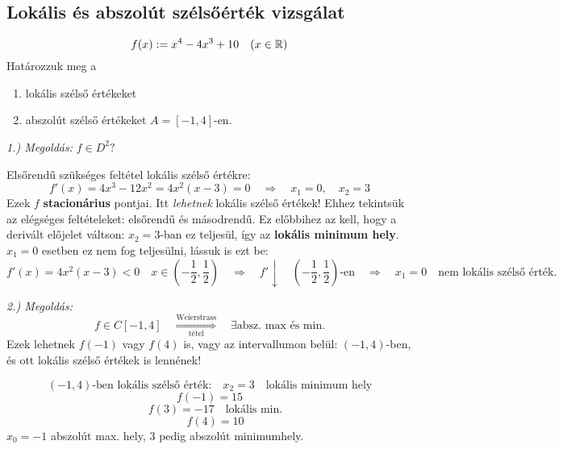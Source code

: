 \documentclass[a4paper,11.5pt]{article}
\begin{document}
	\subsection{Lokális és abszolút szélsőérték vizsgálat}
	\begin{task}
		\[f(x):=x^4-4x^3+10\quad (x\in\mathbb{R})\]
		Határozzuk meg a
		\begin{enumerate}[1.)]
			\item lokális szélső értékeket
			\item abszolút szélső értékeket $A=[-1,4]$-en.
		\end{enumerate}
		
		\textit{1.) Megoldás:} $f\in D^2?$
		
		Elsőrendű szükséges feltétel lokális szélső értékre:
		\[ f'(x)=4x^3-12x^2=4x^2(x-3)=0\quad \Rightarrow\quad x_1=0,\quad x_2=3 \]
		Ezek $f$ \textbf{stacionárius} pontjai. Itt \textit{lehetnek} lokális szélső értékek! Ehhez tekintsük az elégséges feltételeket: elsőrendű és másodrendű. Ez előbbihez az kell, hogy a derivált előjelet váltson: $x_2=3$-ban ez teljesül, így az \textbf{lokális minimum hely}. $x_1=0$ esetben ez nem fog teljesülni, lássuk is ezt be:
		\[ f'(x)=4x^2(x-3)<0\quad x\in\left(-\frac{1}{2},\frac{1}{2}\right)\quad \Rightarrow\quad f'\downarrow\quad \left(-\frac{1}{2},\frac{1}{2}\right)\text{-en}\quad \Rightarrow\quad x_1=0 \quad \text{nem lokális szélső érték.}\]
		
		\textit{2.) Megoldás:} 
		\[ f\in C[-1,4]\quad \overset{\text{Weierstrass}}{\underset{\text{tétel}}{\Longrightarrow}}\quad \exists \text{absz. max és min}. \]
		Ezek lehetnek $f(-1)$ vagy $f(4)$ is, vagy az intervallumon belül: $(-1,4)$-ben, és ott lokális szélső értékek is lennének!
		
		\[ (-1,4)\text{-ben lokális szélső érték:}\quad x_2=3\quad \text{lokális minimum hely} \]
		\[ f(-1)=15\]
		\[\quad f(3)=-17\quad \text{lokális min.}\]
		\[\quad f(4)=10 \]
		$x_0=-1$ abszolút max. hely, 3 pedig abszolút minimumhely.
		
	\end{task}
\end{document}
